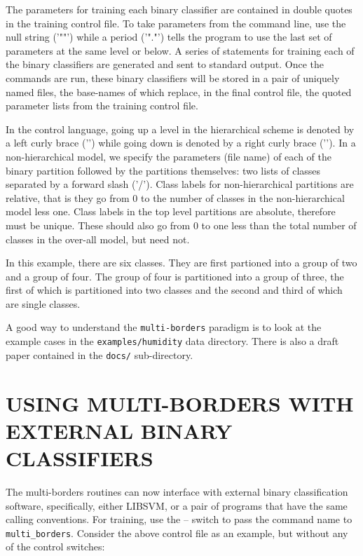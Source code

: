\documentclass[12pt]{article}
\begin{document}
  The parameters for training each binary classifier are contained in double quotes in the training control file.  To take parameters from the command line, use the null string ('""') while a period ('"."') tells the program to use the last set of parameters at the same level or below.  A series of statements for training each of the binary classifiers are generated and sent to standard output.  Once the commands are run, these binary classifiers will be stored in a pair of uniquely named files, the base-names of which replace, in the final control file, the quoted parameter lists from the training control file.

  In the control language, going up a level in the hierarchical scheme is denoted by a left curly brace ('{') while going down is denoted by a right curly brace ('}').  In a non-hierarchical model, we specify the parameters (file name) of each of the binary partition followed by the partitions themselves: two lists of classes separated by a forward slash ('/').  Class labels for non-hierarchical partitions are relative, that is they go from 0 to the number of classes in the non-hierarchical model less one.  Class labels in the top level partitions are absolute, therefore must be unique.  These should also go from 0 to one less than the total number of classes in the over-all model, but need not.

  In this example, there are six classes.  They are first partioned into a group of two and a group of four.  The group of four is partitioned into a group of three, the first of which is partitioned into two classes and the second and third of which are single classes.  

A good way to understand the \verb"multi-borders" paradigm is to look at the example cases in the \verb"examples/humidity" data directory.  There is also a draft paper contained in the \verb"docs/" sub-directory.


\section{USING MULTI-BORDERS WITH EXTERNAL BINARY CLASSIFIERS}

The multi-borders routines can now interface with external binary classification software, specifically, either LIBSVM, or a pair of programs that have the same calling conventions.  For training, use the -- switch to pass the command name to \verb/multi_borders/.  Consider the above control file as an example, but without any of the control switches:
\end{document}
